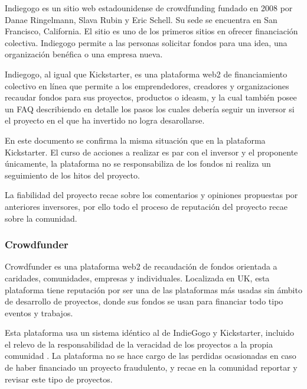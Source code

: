 Indiegogo es un sitio web estadounidense de crowdfunding fundado en 2008 por Danae Ringelmann, Slava Rubin y Eric Schell. Su sede se encuentra en San Francisco, California. El sitio es uno de los primeros sitios en ofrecer financiación colectiva. Indiegogo permite a las personas solicitar fondos para una idea, una organización benéfica o una empresa nueva. \cite{ContributorstoWikimediaprojects2022Aug}

\bigskip

Indiegogo, al igual que Kickstarter, es una plataforma web2 de financiamiento colectivo  en línea que permite a los emprendedores, creadores y organizaciones recaudar fondos para sus proyectos, productos o ideasm, y la cual también posee un FAQ\cite{indiegogohelp} describiendo en detalle los pasos los cuales debería seguir un inversor si el proyecto en el que ha invertido no logra desarollarse.

\bigskip

En este documento se confirma la misma situación que en la plataforma Kickstarter. El curso de acciones a realizar es par con el inversor y el proponente únicamente, la plataforma no se responsabiliza de los fondos ni realiza un seguimiento de los hitos del proyecto. 

\bigskip

La fiabilidad del proyecto recae sobre los comentarios y opiniones propuestas por anteriores inversores, por ello todo el proceso de reputación del proyecto recae sobre la comunidad.

\subsubsection{Crowdfunder}

Crowdfunder es una plataforma web2 de recaudación de fondos orientada a caridades, comunidades, empresas y individuales. Localizada en UK, esta plataforma tiene reputación por ser una de las plataformas más usadas sin ámbito de desarrollo de proyectos, donde sus fondos se usan para financiar todo tipo eventos y trabajos.

\bigskip

Esta plataforma usa un sistema idéntico al de IndieGogo y Kickstarter, incluido el relevo de la responsabilidad de la veracidad de los proyectos a la propia comunidad \cite{crowdfunderhelp}. La plataforma no se hace cargo de las perdidas ocasionadas en caso de haber financiado un proyecto fraudulento, y recae en la comunidad reportar y revisar este tipo de proyectos.

